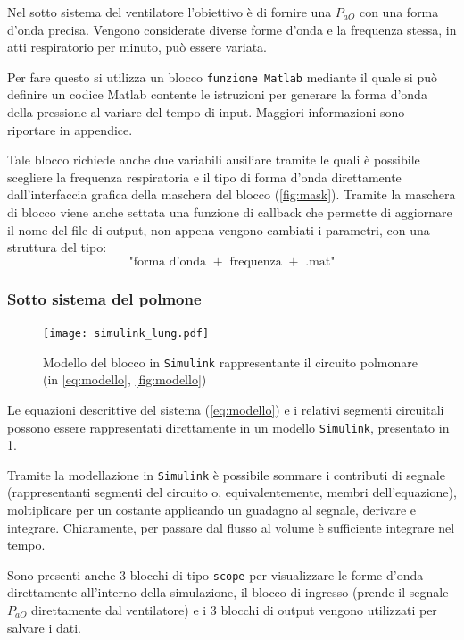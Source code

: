 Nel sotto sistema del ventilatore l'obiettivo è di fornire una $P_{aO}$ con una forma d'onda precisa. Vengono considerate diverse forme d'onda e la frequenza stessa, in atti respiratorio per minuto, può essere variata.

Per fare questo si utilizza un blocco \texttt{funzione Matlab} mediante il quale si può definire un codice Matlab contente le istruzioni per generare la forma d'onda della pressione al variare del tempo di input. Maggiori informazioni sono riportare in appendice. 

Tale blocco richiede anche due variabili ausiliare tramite le quali è possibile scegliere la frequenza respiratoria e il tipo di forma d'onda direttamente dall'interfaccia grafica della maschera del blocco (\cref{fig:mask}). Tramite la maschera di blocco viene anche settata una funzione di callback che permette di aggiornare il nome del file di output, non appena vengono cambiati i parametri, con una struttura del tipo:
\begin{equation*}
	\text{"forma d'onda } + \text{ frequenza } + \text{ .mat"}
\end{equation*}


\subsubsection{Sotto sistema del polmone}


\begin{figure}[t!]
	\centering
	\texttt{[image: simulink\_lung.pdf]}
	\caption{Modello del blocco in  \texttt{Simulink} rappresentante il circuito polmonare (in \cref{eq:modello}, \cref{fig:modello})}
	\label{fig:simulinkLung}
\end{figure}

Le equazioni descrittive del sistema (\cref{eq:modello}) e i relativi segmenti circuitali possono essere rappresentati direttamente in un modello  \texttt{Simulink}, presentato in \cref{fig:simulinkLung}. 

Tramite la modellazione in  \texttt{Simulink} è possibile sommare i contributi di segnale (rappresentanti segmenti del circuito o, equivalentemente, membri dell'equazione), moltiplicare per un costante applicando un guadagno al segnale, derivare e integrare. 
Chiaramente, per passare dal flusso al volume è sufficiente integrare nel tempo. 

Sono presenti anche 3 blocchi di tipo \texttt{scope} per visualizzare le forme d'onda direttamente all'interno della simulazione, il blocco di ingresso (prende il segnale $P_{aO}$ direttamente dal ventilatore) e i 3 blocchi di output vengono utilizzati per salvare i dati. 


